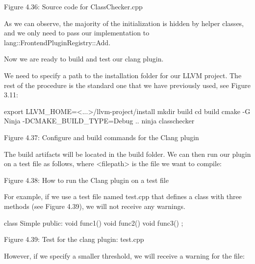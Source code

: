 \begin{center}
Figure 4.36: Source code for ClassChecker.cpp
\end{center}

As we can observe, the majority of the initialization is hidden by helper classes, and we only need to pass our implementation to lang::FrontendPluginRegistry::Add.

Now we are ready to build and test our clang plugin.


We need to specify a path to the installation folder for our LLVM project. The rest of the procedure is the standard one that we have previously used, see Figure 3.11:

\begin{shell}
export LLVM_HOME=<...>/llvm-project/install
mkdir build
cd build
cmake -G Ninja -DCMAKE_BUILD_TYPE=Debug ..
ninja classchecker
\end{shell}

\begin{center}
Figure 4.37: Configure and build commands for the Clang plugin
\end{center}

The build artifacts will be located in the build folder. We can then run our plugin on a test file as follows, where <filepath> is the file we want to compile:


\begin{center}
Figure 4.38: How to run the Clang plugin on a test file
\end{center}

For example, if we use a test file named test.cpp that defines a class with three methods (see Figure 4.39), we will not receive any warnings.

\begin{cpp}
class Simple {
public:
  void func1() {}
  void func2() {}
  void func3() {}
};
\end{cpp}

\begin{center}
Figure 4.39: Test for the clang plugin: test.cpp
\end{center}

However, if we specify a smaller threshold, we will receive a warning for the file:

